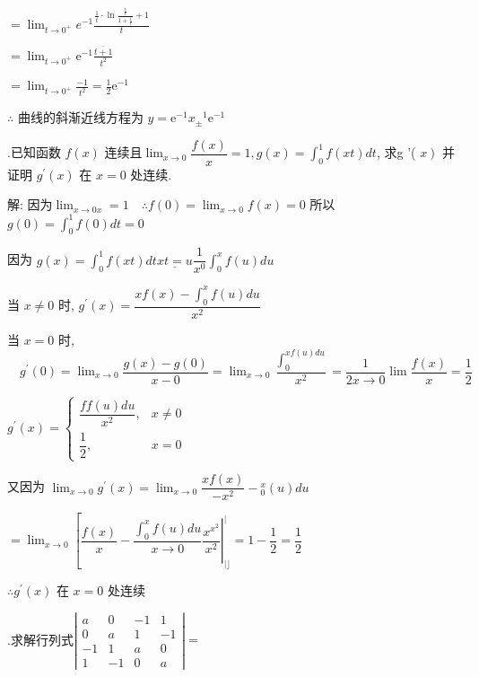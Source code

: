 \documentclass{article}
\begin{document}
$=\lim _{t \rightarrow 0^{+}} e^{-1} \frac{\frac{1}{t} \cdot \ln \frac{\frac{1}{t}}{1+\frac{1}{t}}+1}{t}$

$=\lim _{t \rightarrow 0^{+}} \mathrm{e}^{-1} \frac{\overline{t+1}}{t^{2}}$

$=\lim _{t \rightarrow 0^{+}} \frac{-1}{t^{2}}=\frac{1}{2} \mathrm{e}^{-1}$

$\therefore$ 曲线的斜渐近线方程为 $y=\mathrm{e}^{-1} x_{\pm}{ }^{1} \mathrm{e}^{-1}$

\vspace{1ex}
{.}已知函数 $f(x)$ 连续且$\lim _{x \rightarrow 0} \dfrac{f(x)}{x}=1, g(x)=\int_{0}^{1} f(x t) d t$, 求g '( $\left.x\right)$ 并证明 $g{ }^{\prime}(x)$ 在 $x=0$ 处连续.

解: 因为$\operatorname{lim } _{x \rightarrow 0 x}=1 \quad \therefore f(0)=\lim _{x \rightarrow 0} f(x)=0$
所以 $g(0)=\int_{0}^{1} f(0) d t=0$

因为 $g(x)=\int_{0}^{1} f(x t) d t \underline{x t=u} \dfrac{1}{x^{0}} \int_{0}^{x} f(u) d u$

当 $x \neq 0$ 时, $g^{\prime}(x)=\dfrac{x f(x)-\int_{0}^{x} f(u) d u}{x^{2}}$

当 $x=0$ 时,$\quad g^{\prime}(0)=\lim _{x \rightarrow 0} \dfrac{g(x)-g(0)}{x-0}=\lim _{x \rightarrow 0} \dfrac{\int_{0}^{x f(u) d u}}{x^{2}}=\dfrac{1}{2 x \rightarrow 0} \lim \dfrac{f(x)}{x}=\dfrac{1}{2}$

$g^{\prime}(x)=\left\{\begin{array}{cc}\dfrac{f f(u) d u}{x^{2}}, & x \neq 0 \\ \dfrac{1}{2}, & x=0\end{array}\right.$

又因为 $\lim _{x \rightarrow 0} g^{\prime}(x)=\lim _{x \rightarrow 0} \dfrac{x f(x)}{-x^{2}}-{ }_{0}^{x}(u) d u$

$=\lim _{x \rightarrow 0}\left[\dfrac{f(x)}{x}-\left.\dfrac{\int_{0}^{x} f(u) d u}{x \rightarrow 0} \dfrac{x^{x^{2}}}{x^{2}}\right|_{\mid\rfloor} ^{\mid}=1-\dfrac{1}{2}=\dfrac{1}{2}\right.$

$\therefore g^{\prime}(x)$ 在 $x=0$ 处连续

\vspace{1ex}
{.}求解行列式$\left|\begin{array}{cccc}a & 0 & -1 & 1 \\ 0 & a & 1 & -1 \\ -1 & 1 & a & 0 \\ 1 & -1 & 0 & a\end{array}\right|=$
\end{document}
